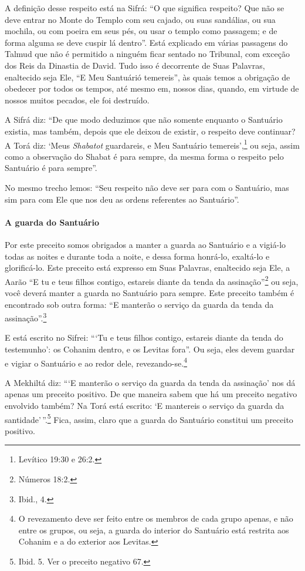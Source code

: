 A definição desse respeito está na Sifrá: ``O que significa respeito?
Que não se deve entrar no Monte do Templo com seu cajado, ou suas
sandálias, ou sua mochila, ou com poeira em seus pés, ou usar o templo
como passagem; e de forma alguma se deve cuspir lá dentro''. Está
explicado em várias passagens do Talmud que não é permitido a ninguém
ficar sentado no Tribunal, com exceção dos Reis da Dinastia de David.
Tudo isso é decorrente de Suas Palavras, enaltecido seja Ele, ``E Meu
Santuárió temereis'', às quais temos a obrigação de obedecer por todos
os tempos, até mesmo em, nossos dias, quando, em virtude de nossos
muitos pecados, ele foi destruído.

A Sifrá diz: ``De que modo deduzimos que não somente enquanto o
Santuário existia, mas também, depois que ele deixou de existir, o
respeito deve continuar? A Torá diz: `Meus \emph{Shabatot} guardareis,
e Meu Santuário temereis',\footnote{Levítico 19:30 e 26:2.} ou seja, assim como a observação do
Shabat é para sempre, da mesma forma o respeito pelo Santuário é para
sempre''.

No mesmo trecho lemos: ``Seu respeito não deve ser para com o Santuário,
mas sim para com Ele que nos deu as ordens referentes ao Santuário''.

\paragraph{A guarda do Santuário}

Por este preceito somos obrigados a manter a guarda ao Santuário e a
vigiá-lo todas as noites e durante toda a noite, e dessa forma honrá-lo,
exaltá-lo e glorificá-lo. Este preceito está expresso em Suas Palavras,
enaltecido seja Ele, a Aarão ``E tu e teus filhos contigo, estareis
diante da tenda da assinação''\footnote{Números 18:2.} ou seja, você deverá
manter a guarda no Santuário para sempre. Este preceito também é
encontrado sob outra forma: ``E manterão o serviço da guarda da tenda da
assinação''.\footnote{Ibid., 4.}


E está escrito no Sifrei: ```Tu e teus filhos contigo, estareis diante
da tenda do testemunho': os Cohanim dentro, e os Levitas fora''. Ou
seja, eles devem guardar e vigiar o Santuário e ao redor dele,
revezando-se.\footnote{O revezamento deve ser feito entre os membros de cada grupo apenas, e
  não entre os grupos, ou seja, a guarda do interior do Santuário está
  restrita aos Cohanim e a do exterior aos Levitas.}

A Mekhiltá diz: ```E manterão o serviço da guarda da tenda da assinação'
nos dá apenas um preceito positivo. De que maneira sabem que há um
preceito negativo envolvido também? Na Torá está escrito: `E mantereis
o serviço da guarda da santidade'\,''.\footnote{Ibid. 5. Ver o preceito negativo 67.} Fica, assim, claro que a guarda do Santuário constitui um preceito positivo.

